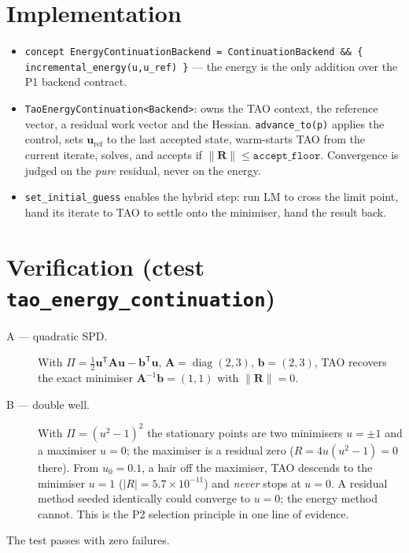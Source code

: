 \section{Implementation}

\begin{itemize}
  \item \texttt{concept EnergyContinuationBackend =
        ContinuationBackend \&\& \{ incremental\_energy(u,u\_ref) \}} ---
        the energy is the only addition over the P1 backend contract.
  \item \texttt{TaoEnergyContinuation<Backend>}: owns the TAO context,
        the reference vector, a residual work vector and the Hessian.
        \texttt{advance\_to(p)} applies the control, sets
        \(\mathbf{u}_\text{ref}\) to the last accepted state, warm-starts
        TAO from the current iterate, solves, and accepts if
        \(\lVert\mathbf{R}\rVert\le\texttt{accept\_floor}\). Convergence is
        judged on the \emph{pure} residual, never on the energy.
  \item \texttt{set\_initial\_guess} enables the hybrid step: run LM to
        cross the limit point, hand its iterate to TAO to settle onto the
        minimiser, hand the result back.
\end{itemize}

\section{Verification (ctest \texttt{tao\_energy\_continuation})}

\begin{description}
  \item[A --- quadratic SPD.] With \(\Pi=\tfrac12\mathbf{u}^{\mathsf T}
        \mathbf{A}\mathbf{u}-\mathbf{b}^{\mathsf T}\mathbf{u}\),
        \(\mathbf{A}=\operatorname{diag}(2,3)\),
        \(\mathbf{b}=(2,3)\), TAO recovers the exact minimiser
        \(\mathbf{A}^{-1}\mathbf{b}=(1,1)\) with \(\lVert\mathbf{R}\rVert=0\).
  \item[B --- double well.] With \(\Pi=(u^2-1)^2\) the stationary points
        are two minimisers \(u=\pm1\) and a maximiser \(u=0\); the
        maximiser is a residual zero (\(R=4u(u^2-1)=0\) there). From
        \(u_0=0.1\), a hair off the maximiser, TAO descends to the
        minimiser \(u=1\) (\(|R|=5.7\times10^{-11}\)) and \emph{never}
        stops at \(u=0\). A residual method seeded identically could
        converge to \(u=0\); the energy method cannot. This is the P2
        selection principle in one line of evidence.
\end{description}
%
The test passes with zero failures.

